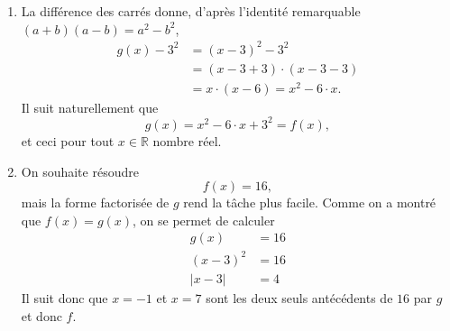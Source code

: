 \documentclass[a4paper, 14pt]{extarticle}
\theoremstyle{plain}
\theoremstyle{definition}
\newcommand{\R}{\mathbb{R}}
\begin{document}
{\begin{enumerate}
			\item
			La différence des carrés donne, d'après l'identité remarquable $(a+b)(a-b) = a^2 - b^2$, 
				\begin{align*}
					g(x) - 3^2 &= (x-3)^2 - 3^2 \\
								&= (x-3+3) \cdot (x-3-3) \\
								&= x \cdot (x-6) = x^2 - 6\cdot x.
				\end{align*}
			Il suit naturellement que
				\[ g(x) = x^2 - 6\cdot x + 3^2 = f(x), \]
			et ceci pour tout $x\in\R$ nombre réel.
			
			\item
			On souhaite résoudre
				\[ f(x) = 16, \]
			mais la forme factorisée de $g$ rend la tâche plus facile.
			Comme on a montré que $f(x) = g(x)$, on se permet de calculer
				\begin{align*}
					g(x) &= 16 \\
					(x-3)^2 &= 16 \\
					|x-3| &= 4
				\end{align*}
			Il suit donc que $x=-1$ et $x=7$ sont les deux seuls antécédents de $16$ par $g$ et donc $f$.
		\end{enumerate}
	
	}
\end{document}
